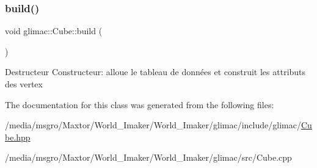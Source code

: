 \subsubsection{\texorpdfstring{build()}{build()}}
{\footnotesize\ttfamily void glimac\+::\+Cube\+::build (\begin{DoxyParamCaption}{ }\end{DoxyParamCaption})}

Destructeur Constructeur\+: alloue le tableau de données et construit les attributs des vertex 

The documentation for this class was generated from the following files\+:\begin{DoxyCompactItemize}
\item 
/media/msgro/\+Maxtor/\+World\+\_\+\+Imaker/\+World\+\_\+\+Imaker/glimac/include/glimac/\hyperlink{Cube_8hpp}{Cube.\+hpp}\item 
/media/msgro/\+Maxtor/\+World\+\_\+\+Imaker/\+World\+\_\+\+Imaker/glimac/src/Cube.\+cpp\end{DoxyCompactItemize}
